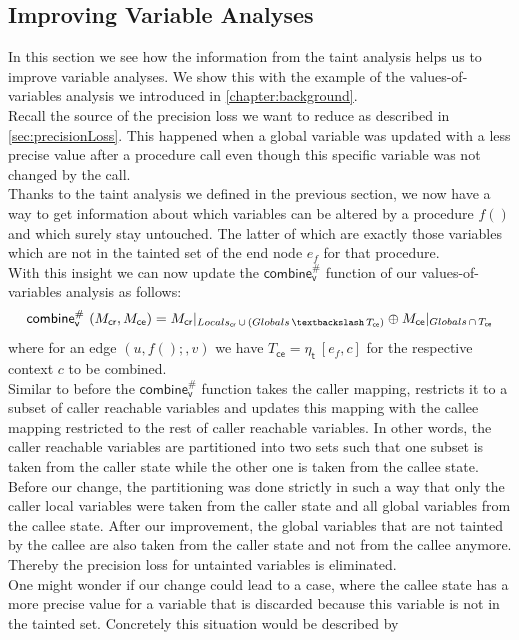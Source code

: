     \subsection{Improving Variable Analyses}\label{sec:formalImprove}
    In this section we see how the information from the taint analysis helps us to improve variable analyses. We show this with the example of the values-of-variables analysis we introduced in \autoref{chapter:background}.\\
    Recall the source of the precision loss we want to reduce as described in \autoref{sec:precisionLoss}. This happened when a global variable was updated with a less precise value after a procedure call even though this specific variable was not changed by the call.\\
    Thanks to the taint analysis we defined in the previous section, we now have a way to get information about which variables can be altered by a procedure $f()$ and which surely stay untouched. The latter of which are exactly those variables which are not in the tainted set of the end node $e_f$ for that procedure.\\
    With this insight we can now update the $\textsf{combine}^{\#}_\textsf{v}$ function of our values-of-variables analysis as follows:
    \[
      \textsf{combine}^{\#}_\textsf{v}\ (M_\textsf{cr}, M_\textsf{ce}) = M_\textsf{cr}|_{Locals_\textsf{cr}\, \cup\, (Globals\, \textbackslash\, T_\textsf{ce})} \oplus M_\textsf{ce}|_{Globals\, \cap\, T_\textsf{ce}}
    \]
    where for an edge $(u, f();, v)$ we have $T_\textsf{ce} = \eta_\textsf{t}\ [e_f, c]$ for the respective context $c$ to be combined.\\
    Similar to before the $\textsf{combine}^{\#}_\textsf{v}$ function takes the caller mapping, restricts it to a subset of caller reachable variables and updates this mapping with the callee mapping restricted to the rest of caller reachable variables. In other words, the caller reachable variables are partitioned into two sets such that one subset is taken from the caller state while the other one is taken from the callee state. Before our change, the partitioning was done strictly in such a way that only the caller local variables were taken from the caller state and all global variables from the callee state. After our improvement, the global variables that are not tainted by the callee are also taken from the caller state and not from the callee anymore. Thereby the precision loss for untainted variables is eliminated.
    \\
    One might wonder if our change could lead to a case, where the callee state has a more precise value for a variable that is discarded because this variable is not in the tainted set. Concretely this situation would be described by 
